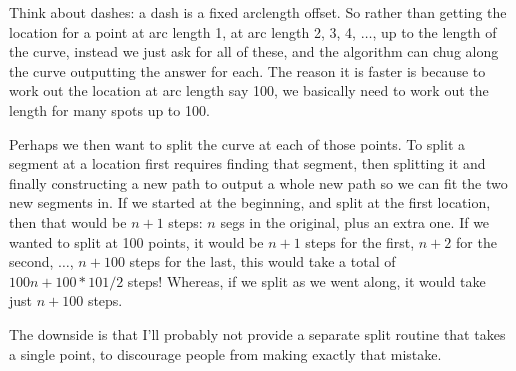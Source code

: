 \documentclass[openany]{book}
\begin{document}
Think about dashes: a dash is a fixed arclength offset.  So rather
than getting the location for a point at arc length 1, at arc length
2, 3, 4, $\ldots$, up to the length of the curve, instead we just ask for all of
these, and the algorithm can chug along the curve outputting the
answer for each.  The reason it is faster is because to work out the
location at arc length say 100, we basically need to work out the
length for many spots up to 100.

Perhaps we then want to split the curve at each of those points.  To
split a segment at a location first requires finding that segment,
then splitting it and finally constructing a new path to output a whole
new path so we can fit the two new segments in.  If we started at the
beginning, and split at the first location, then that would be $n+1$ steps: $n$
segs in the original, plus an extra one.  If we wanted to split at 100
points, it would be $n+1$ steps for the first, $n+2$ for the
second, $\ldots$, $n+100$ steps for the last, this would take a total of $100n +
100*101/2$ steps!  Whereas, if we split as we went along, it would take
just $n+100$ steps.

The downside is that I'll probably not provide a separate split
routine that takes a single point, to discourage people from making
exactly that mistake.
\end{document}
